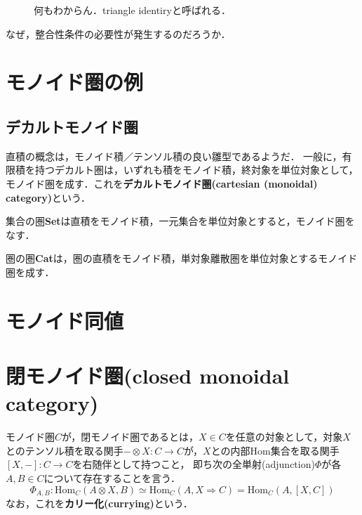 \documentclass[uplatex, 12pt, dvipdfmx]{jsreport}
\begin{document}
\begin{figure}[h]\begin{center}\caption{何もわからん．triangle identiryと呼ばれる．\label{def-monoidal-2}}
\end{center}\end{figure}

なぜ，整合性条件の必要性が発生するのだろうか．

\section{モノイド圏の例}

\subsection{デカルトモノイド圏}
直積の概念は，モノイド積／テンソル積の良い雛型であるようだ．
一般に，有限積を持つデカルト圏は，いずれも積をモノイド積，終対象を単位対象として，モノイド圏を成す．これを\textbf{デカルトモノイド圏(cartesian (monoidal) category)}という．

集合の圏\textbf{Set}は直積をモノイド積，一元集合を単位対象とすると，モノイド圏をなす．

圏の圏\textbf{Cat}は，圏の直積をモノイド積，単対象離散圏を単位対象とするモノイド圏を成す．

\section{モノイド同値}

\section{閉モノイド圏(closed monoidal category)}
\begin{definition}\rm{}
    モノイド圏$C$が，閉モノイド圏であるとは，$X\in C$を任意の対象として，対象$X$とのテンソル積を取る関手$-\otimes X:C\to C$が，$X$との内部Hom集合を取る関手$[X,-]:C\to C$を右随伴として持つこと，
    即ち次の全単射(adjunction)$\Phi$が各$A,B\in C$について存在することを言う．
    $$\Phi_{A,B}:\mathrm{Hom}_C(A\otimes X,B)\simeq \mathrm{Hom}_C(A,X\Rightarrow C) = \mathrm{Hom}_C(A,[X,C])$$
    なお，これを\textbf{カリー化(currying)}という．
\end{definition}
\end{document}
